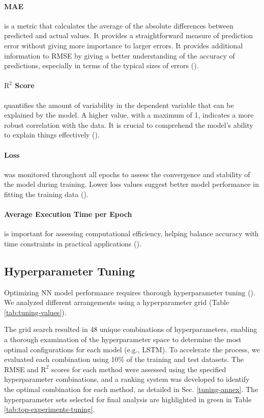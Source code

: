 \documentclass[journal,onecolumn]{IEEEtran}
\begin{document}
{\paragraph{MAE}
is a metric that calculates the average of the absolute differences between predicted and actual values. It provides a straightforward measure of prediction error without giving more importance to larger errors. It provides additional information to RMSE by giving a better understanding of the accuracy of predictions, especially in terms of the typical sizes of errors (\cite{cr05willmott}).

\paragraph{$\text{R}^2$ Score}
quantifies the amount of variability in the dependent variable that can be explained by the model. A higher value, with a maximum of 1, indicates a more robust correlation with the data. It is crucial to comprehend the model's ability to explain things effectively (\cite{biomet91nagelkerke}).

\paragraph{Loss}
was monitored throughout all epochs to assess the convergence and stability of the model during training. Lower loss values suggest better model performance in fitting the training data (\cite{mit16goodfellow}).

\paragraph{Average Execution Time per Epoch}
is important for assessing computational efficiency, helping balance accuracy with time constraints in practical applications (\cite{jproc17sze}).

\subsection{Hyperparameter Tuning}
Optimizing NN model performance requires thorough hyperparameter tuning (\cite{mit16goodfellow}). We analyzed different arrangements using a hyperparameter grid (Table \ref{tab:tuning-values}).

The grid search resulted in 48 unique combinations of hyperparameters, enabling a thorough examination of the hyperparameter space to determine the most optimal configurations for each model (e.g., LSTM). To accelerate the process, we evaluated each combination using 10\% of the training and test datasets. The RMSE and $\text{R}^2$ scores for each method were assessed using the specified hyperparameter combinations, and a ranking system was developed to identify the optimal combination for each method, as detailed in Sec. \ref{tuning-annex}. The hyperparameter sets selected for final analysis are highlighted in green in Table \ref{tab:top-experiments-tuning}.

}
\end{document}
